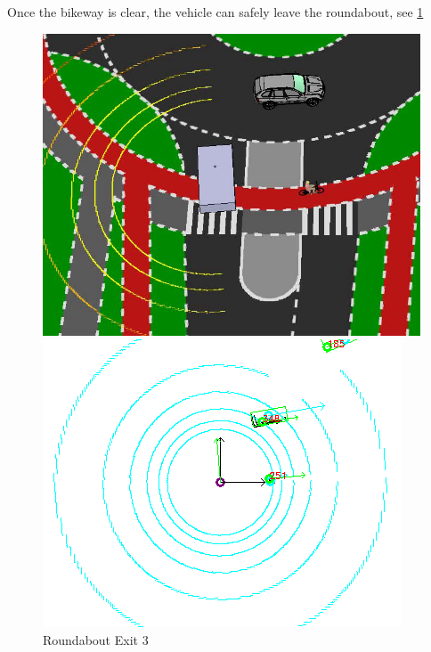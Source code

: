 \documentclass[11pt,oneside,openright]{mpreport}
\begin{document}
Once the bikeway is clear, the vehicle can safely leave the roundabout, see \cref{roundabout_exit_3}

\begin{figure}[htb]
  \caption{Roundabout Exit 3} 
    \centering
    \begin{minipage}[t]{0.49\textwidth}
        \centering
          \includegraphics[width=\textwidth]{bilder/sim11.png}
    \end{minipage}%
    \hfill
    \begin{minipage}[t]{0.49\textwidth}
        \centering
	\includegraphics[width=\textwidth]{bilder/sim12.png}
    \end{minipage}
    \label{roundabout_exit_3}
\end{figure}
\end{document}
